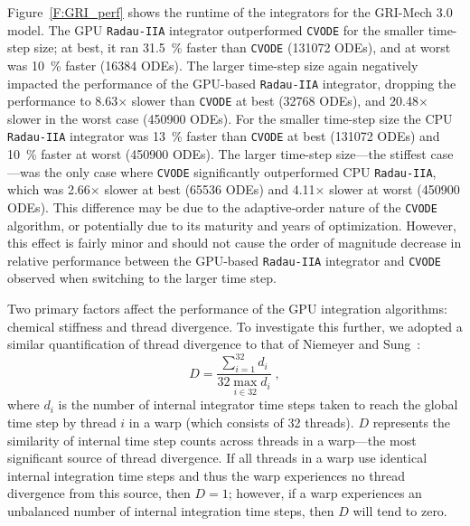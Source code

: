 \documentclass[final,twocolumn]{elsarticle}
\begin{document}
Figure~\ref{F:GRI_perf} shows the runtime of the integrators for the GRI-Mech 3.0 model.
The GPU \texttt{Radau-IIA} integrator outperformed \texttt{CVODE} for the smaller time-step size; at best, it ran \SI{31.5}{\percent} faster than \texttt{CVODE} (\num{131072} ODEs), and at worst was \SI{10}{\percent} faster (\num{16384} ODEs).
The larger time-step size again negatively impacted the performance of the GPU-based \texttt{Radau-IIA} integrator, dropping the performance to \num{8.63}$\times$ slower than \texttt{CVODE} at best (\num{32768} ODEs), and \num{20.48}$\times$ slower in the worst case (\num{450900} ODEs).
For the smaller time-step size the CPU \texttt{Radau-IIA} integrator was \SI{13}{\percent} faster than \texttt{CVODE} at best (\num{131072} ODEs) and \SI{10}{\percent} faster at worst (\num{450900} ODEs).
The larger time-step size---the stiffest case---was the only case where \texttt{CVODE} significantly outperformed CPU \texttt{Radau-IIA}, which was \num{2.66}$\times$ slower at best (\num{65536} ODEs) and \num{4.11}$\times$ slower at worst (\num{450900} ODEs).
This difference may be due to the adaptive-order nature of the \texttt{CVODE} algorithm, or potentially due to its maturity and years of optimization.
However, this effect is fairly minor and should not cause the order of magnitude decrease in relative performance between the GPU-based \texttt{Radau-IIA} integrator and \texttt{CVODE} observed when switching to the larger time step.

Two primary factors affect the performance of the GPU integration algorithms: chemical stiffness and thread divergence.
To investigate this further, we adopted a similar quantification of thread divergence to that of Niemeyer and Sung~\cite{Niemeyer:2014aa}:
\begin{equation}
	D = \frac{\sum_{i=1}^{32}{d_i}}{32 \max_{i \in 32} d_i} \;,
	\label{eqn:divergence}
\end{equation}
where $d_i$ is the number of internal integrator time steps taken to reach the global time step by thread $i$ in a warp (which consists of 32 threads).
$D$ represents the similarity of internal time step counts across threads in a warp---the most significant source of thread divergence.
If all threads in a warp use identical internal integration time steps and thus the warp experiences no thread divergence from this source, then $D = 1$; however, if a warp experiences an unbalanced number of internal integration time steps, then $D$ will tend to zero.
\end{document}
